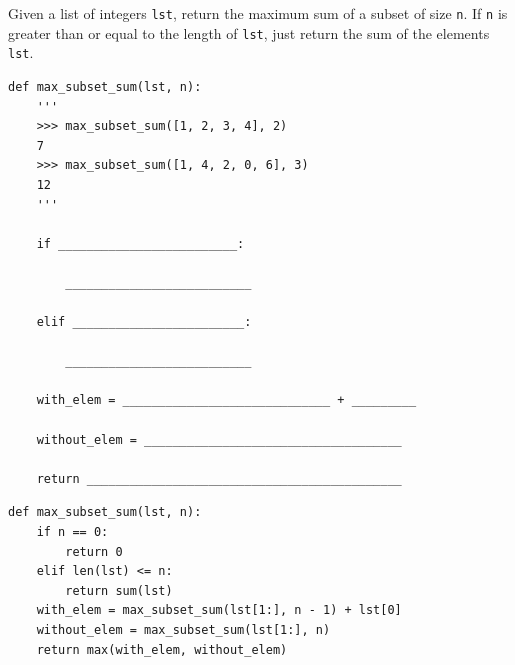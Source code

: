 \begin{blocksection}


\question
Given a list of integers \lstinline{lst}, return the maximum sum of a subset of size \lstinline{n}. If \lstinline{n} is greater than or equal to the length of \lstinline{lst}, just return the sum of the elements \lstinline{lst}.

\begin{lstlisting}
def max_subset_sum(lst, n):
    '''
    >>> max_subset_sum([1, 2, 3, 4], 2)
    7
    >>> max_subset_sum([1, 4, 2, 0, 6], 3)
    12
    '''

    if _________________________:

        __________________________

    elif ________________________:

        __________________________

    with_elem = _____________________________ + _________

    without_elem = ____________________________________

    return ____________________________________________
\end{lstlisting}

\begin{solution}
\begin{lstlisting}
def max_subset_sum(lst, n):
    if n == 0:
        return 0
    elif len(lst) <= n:
        return sum(lst)
    with_elem = max_subset_sum(lst[1:], n - 1) + lst[0]
    without_elem = max_subset_sum(lst[1:], n)
    return max(with_elem, without_elem)
\end{lstlisting}
\end{solution}


\end{blocksection}
